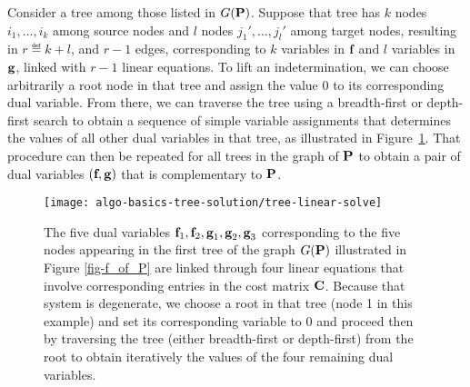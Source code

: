 Consider a tree among those listed in $G(\P)$. Suppose that tree has $k$ nodes $i_1,\dots,i_k$ among source nodes and $l$ nodes $j_1',\dots,j_{l}'$ among target nodes, resulting in $r\eqdef k+l$, and $r-1$ edges, corresponding to $k$ variables in $\fD$ and $l$ variables in $\gD$, linked with $r-1$ linear equations. To lift an indetermination, we can choose arbitrarily a root node in that tree and assign the value $0$ to its corresponding dual variable. From there, we can traverse the tree using a breadth-first or depth-first search to obtain a sequence of simple variable assignments that determines the values of all other dual variables in that tree, as illustrated in Figure~\ref{fig-tree-linear-solve}. That procedure can then be repeated for all trees in the graph of $\P$ to obtain a pair of dual variables $(\fD,\gD)$ that is complementary to $\P$.

\begin{figure}[h!]
	\centering
	\texttt{[image: algo-basics-tree-solution/tree-linear-solve]}
	\caption{\label{fig-tree-linear-solve}
 The five dual variables $\fD_1,\fD_2,\gD_1,\gD_2,\gD_3$ corresponding to the five nodes appearing in the first tree of the graph $G(\P)$ illustrated in Figure \ref{fig-f_of_P} are linked through four linear equations that involve corresponding entries in the cost matrix $\C$. Because that system is degenerate, we choose a root in that tree (node 1 in this example) and set its corresponding variable to $0$ and proceed then by traversing the tree (either breadth-first or depth-first) from the root to obtain iteratively the values of the four remaining dual variables.}
\end{figure}

